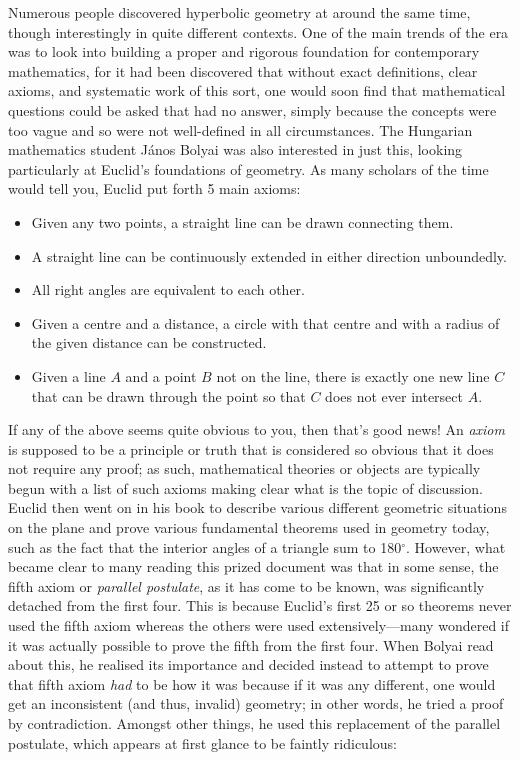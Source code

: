 \begin{multicols}{2}

Numerous people discovered hyperbolic geometry at around the same time, though interestingly in quite different contexts. One of the main trends of the era was to look into building a proper and rigorous foundation for contemporary mathematics, for it had been discovered that without exact definitions, clear axioms, and systematic work of this sort, one would soon find that mathematical questions could be asked that had no answer, simply because the concepts were too vague and so were not well-defined in all circumstances. The Hungarian mathematics student J\'{a}nos Bolyai was also interested in just this, looking particularly at Euclid's foundations of geometry. As many scholars of the time would tell you, Euclid put forth 5 main axioms:

\begin{itemize}
\item Given any two points, a straight line can be drawn connecting them.
\item A straight line can be continuously extended in either direction unboundedly.
\item All right angles are equivalent to each other.
\item Given a centre and a distance, a circle with that centre and with a radius of the given distance can be constructed.
\item Given a line \(A\) and a point \(B\) not on the line, there is exactly one new line \(C\) that can be drawn through the point so that \(C\) does not ever intersect \(A\).
\end{itemize}

If any of the above seems quite obvious to you, then that's good news! An \textit{axiom} is supposed to be a principle or truth that is considered so obvious that it does not require any proof; as such, mathematical theories or objects are typically begun with a list of such axioms making clear what is the topic of discussion. Euclid then went on in his book to describe various different geometric situations on the plane and prove various fundamental theorems used in geometry today, such as the fact that the interior angles of a triangle sum to 180\(^\circ\). However, what became clear to many reading this prized document was that in some sense, the fifth axiom or \textit{parallel postulate}, as it has come to be known, was significantly detached from the first four. This is because Euclid's first 25 or so theorems never used the fifth axiom whereas the others were used extensively---many wondered if it was actually possible to prove the fifth from the first four. When Bolyai read about this, he realised its importance and decided instead to attempt to prove that fifth axiom \textit{had} to be how it was because if it was any different, one would get an inconsistent (and thus, invalid) geometry; in other words, he tried a proof by contradiction. Amongst other things, he used this replacement of the parallel postulate, which appears at first glance to be faintly ridiculous:


\end{multicols}
